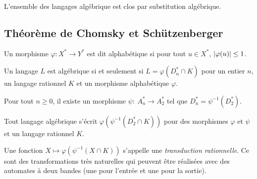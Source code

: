 \documentclass[../../agregation.tex]{subfiles}
\begin{document}
\begin{prop}
	L'ensemble des langages algébrique est clos par substitution algébrique.
\end{prop}

\subsection{Théorème de Chomsky et Schützenberger} %

\begin{defn}
	Un morphisme $\varphi:X^*\to Y^*$ est dit alphabétique si pour tout $u\in X^*$, $\left|\varphi(u)\right| \le 1$.
\end{defn}

\begin{thm}
	Un langage $L$ est algébrique si et seulement si $L=\varphi(D^*_n\cap K)$ pour un entier $n$, un langage rationnel $K$ et un morphisme alphabétique $\varphi$.
\end{thm}

\begin{lem}
	Pour tout $n \ge 0$, il existe un morphisme $\psi:\ A_{n}^{*}\to A_{2}^{*}$ tel que $D_{n}^{*}=\psi^{-1}\left(D_{2}^{*}\right)$.
\end{lem}

\begin{cor}
	Tout langage algébrique s'écrit $\varphi\left(\psi^{-1}\left(D_{2}^{*}\cap K\right)\right)$
	pour des morphismes $\varphi$ et $\psi$ et un langage rationnel
	$K$.
\end{cor}

\begin{rem}
	Une fonction $X\mapsto\varphi\left(\psi^{-1}\left(X\cap K\right)\right)$
	s'appelle une \emph{transduction rationnelle}. Ce sont des transformations
	très naturelles qui peuvent être réalisées avec des automates à deux
	bandes (une pour l'entrée et une pour la sortie).
\end{rem}

%
\end{document}
